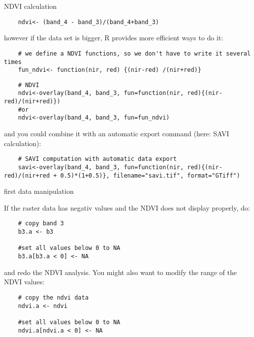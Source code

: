 \begin{frame}[fragile]{NDVI calculation}

    \begin{lstlisting}
	ndvi<- (band_4 - band_3)/(band_4+band_3)
   \end{lstlisting}

\bigskip \pause

however if the data set is bigger, R provides more efficient ways to do it:

\bigskip \pause

 \begin{lstlisting}
	# we define a NDVI functions, so we don't have to write it several times
	fun_ndvi<- function(nir, red) {(nir-red) /(nir+red)} 
   \end{lstlisting}

   \bigskip \pause

 \begin{lstlisting}
	# NDVI
	ndvi<-overlay(band_4, band_3, fun=function(nir, red){(nir-red)/(nir+red)})
	#or
	ndvi<-overlay(band_4, band_3, fun=fun_ndvi)
   \end{lstlisting}

\bigskip \pause and you could combine it with an automatic export command (here: SAVI calculation):

 \begin{lstlisting}
	# SAVI computation with automatic data export
	savi<-overlay(band_4, band_3, fun=function(nir, red){(nir-red)/(nir+red + 0.5)*(1+0.5)}, filename="savi.tif", format="GTiff")
   \end{lstlisting}


\end{frame}


\begin{frame}[fragile]{first data manipulation}

If the raster data has negativ values and the NDVI does not display properly, do:

    \begin{lstlisting}
	# copy band 3
	b3.a <- b3
	
	#set all values below 0 to NA
	b3.a[b3.a < 0] <- NA
   \end{lstlisting}

   \bigskip
   
   and redo the NDVI  analysis.  \pause You might also want to modify the range of the NDVI values:

       \begin{lstlisting}
	# copy the ndvi data
	ndvi.a <- ndvi
	
	#set all values below 0 to NA
	ndvi.a[ndvi.a < 0] <- NA
	\end{lstlisting}
   
\end{frame}


